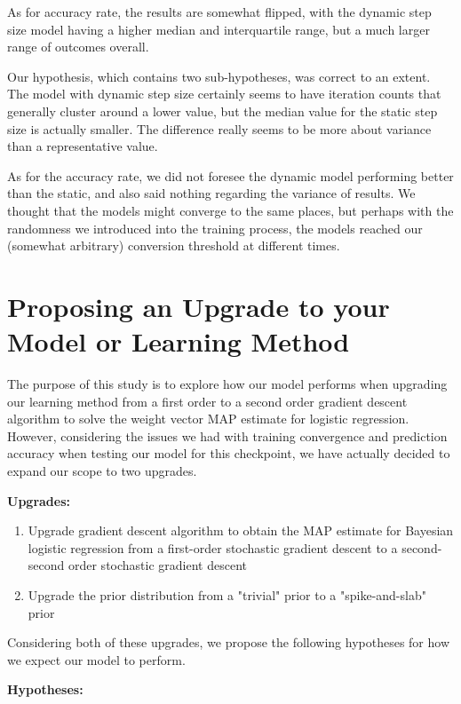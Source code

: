 \documentclass[12pt]{article}
\begin{document}
As for accuracy rate, the results are somewhat flipped, with the dynamic step size model having a higher median and interquartile range, but a much larger range of outcomes overall. 

Our hypothesis, which contains two sub-hypotheses, was correct to an extent. The model with dynamic step size certainly seems to have iteration counts that generally cluster around a lower value, but the median value for the static step size is actually smaller. The difference really seems to be more about variance than a representative value.

As for the accuracy rate, we did not foresee the dynamic model performing better than the static, and also said nothing regarding the variance of results. We thought that the models might converge to the same places, but perhaps with the randomness we introduced into the training process, the models reached our (somewhat arbitrary) conversion threshold at different times.


\section{Proposing an Upgrade to your Model or Learning Method}

The purpose of this study is to explore how our model performs when upgrading our
learning method from a first order to a second order gradient descent algorithm to solve the
weight vector MAP estimate for logistic regression. However, considering the issues we had with training convergence and prediction accuracy when testing our model for this checkpoint, we have actually decided to expand our scope to two upgrades.

\textbf{Upgrades:}

\begin{enumerate}
\item Upgrade gradient descent algorithm to obtain the MAP estimate for Bayesian logistic regression from a first-order stochastic gradient descent to a second-second order stochastic gradient descent
\item Upgrade the prior distribution from a "trivial" prior to a "spike-and-slab" prior
\end{enumerate}


Considering both of these upgrades, we propose the following hypotheses
for how we expect our model to perform.

\textbf{Hypotheses:}
\end{document}
